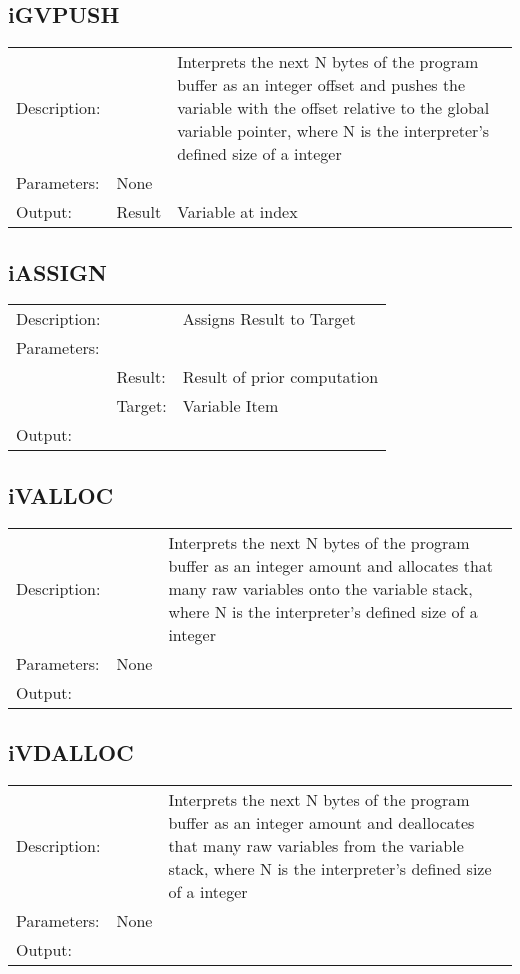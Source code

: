 \documentclass{report}
\begin{document}
\subsection{iGVPUSH}
\begin{tabular}{l l p{10cm}}
Description: & ~    & Interprets the next N bytes of the program buffer as an integer offset and pushes the variable with the offset relative to the global variable pointer, where N is the interpreter's defined size of a integer \\
Parameters:  & None & ~ \\
Output:      & Result & Variable at index\\
\end{tabular}

\subsection{iASSIGN}
\begin{tabular}{l l p{10cm}}
Description: & ~    & Assigns Result to Target\\
Parameters:  & ~ & ~ \\
~			 & Result: & Result of prior computation\\
~			 & Target: & Variable Item\\
Output:      & ~ & ~\\
\end{tabular}

\subsection{iVALLOC}
\begin{tabular}{l l p{10cm}}
Description: & ~    & Interprets the next N bytes of the program buffer as an integer amount and allocates that many raw variables onto the variable stack, where N is the interpreter's defined size of a integer \\
Parameters:  & None & ~ \\
Output:      & ~ & ~\\
\end{tabular}

\subsection{iVDALLOC}
\begin{tabular}{l l p{10cm}}
Description: & ~    & Interprets the next N bytes of the program buffer as an integer amount and deallocates that many raw variables from the variable stack, where N is the interpreter's defined size of a integer \\
Parameters:  & None & ~ \\
Output:      & ~ & ~\\
\end{tabular}
\end{document}
